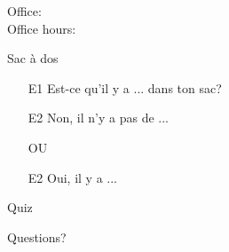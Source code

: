 \documentclass{beamer}
\subtitle[À la fac]{À la fac}
\begin{document}
  \begin{frame}
    \titlepage
    \tiny{Office: \\
          Office hours: }
  \end{frame}


  \begin{frame}{Sac à dos}
    \begin{itemize}
      \item[E1] Est-ce qu'il y a ... dans ton sac?
      \item[E2] Non, il n'y a pas de ...
      \item[] OU
      \item[E2] Oui, il y a ...
    \end{itemize}
  \end{frame}

  \begin{frame}{}
    \begin{center}
      \Large Quiz
    \end{center}
  \end{frame}

  \begin{frame}{}
    \begin{center}
      \Large Questions?
    \end{center}
  \end{frame}
\end{document}
